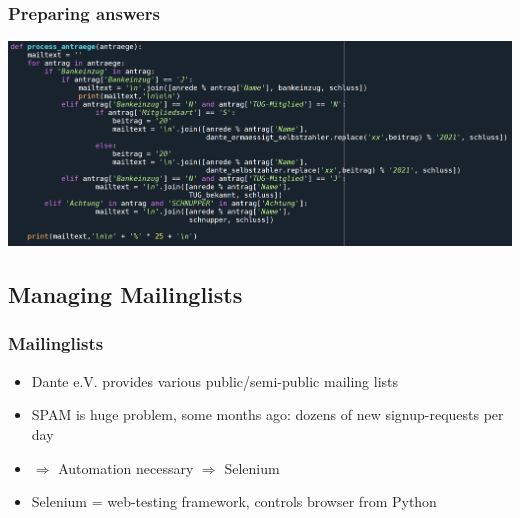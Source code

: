 \documentclass[12pt,ngerman]{beamer}
\begin{document}
\begin{frame}
\frametitle{Preparing answers}

\begin{center}
\hspace*{-1em}\includegraphics[width=1.1\textwidth]{process}
\end{center}

\end{frame}

\begin{frame}
\section{Managing Mailinglists}
\end{frame}

\begin{frame}
\frametitle{Mailinglists}

\begin{itemize}
\item Dante e.V. provides various public/semi-public mailing lists
\item SPAM is huge problem, some months ago: dozens of new signup-requests per day
\item $\Rightarrow$ Automation necessary $\Rightarrow$ Selenium
\item Selenium = web-testing framework, controls browser from Python
\end{itemize}
\end{frame}
\end{document}
